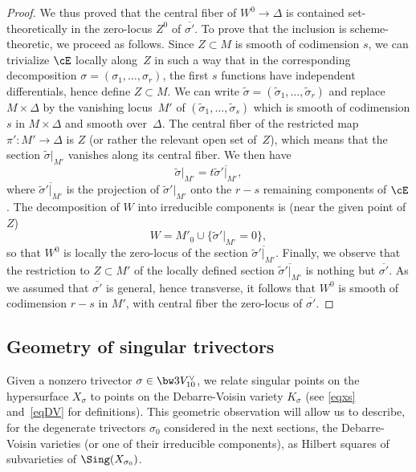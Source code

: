 \begin{proof}
We thus proved that
the central fiber of $W^0\to \Delta$ is contained set-theoretically in the zero-locus $Z^0$ of $\overline {\sigma'} $. To prove that the inclusion is scheme-theoretic, we proceed as follows.
Since $Z\subset M$ is smooth of codimension $s$, we can trivialize $\cE$ locally along~$Z$ in such a way
that in the corresponding decomposition $\sigma=(\sigma_1,\ldots,\sigma_r)$, the first $s$ functions have independent differentials, hence define $Z\subset M$. We can write
$\widetilde\sigma=(\widetilde\sigma_1,\ldots,\widetilde\sigma_r)$ and replace $M\times \Delta$ by the vanishing locus~$M'$ of
$(\widetilde\sigma_1,\ldots,\widetilde\sigma_s)$ which is smooth of codimension $s$ in $M\times \Delta$ and smooth
over~$\Delta$. The central fiber of the restricted map $\pi'\colon M'\to \Delta$ is $Z$ (or rather the relevant open set of~$Z$),
which means that the section $\widetilde\sigma\vert_{ M'}$ vanishes along its central fiber. We then have
\begin{equation}\label{eqpourMprime}
\widetilde\sigma\vert_{ M'}=t\overline{\widetilde\sigma'\vert_{ M'}},
\end{equation}
where $\overline{\widetilde\sigma'\vert_{ M'}}$ is the projection of $\widetilde\sigma'\vert_{ M'}$ onto the
$r-s$ remaining components of $\cE$.
The decomposition of $W$ into irreducible components is (near the given point of $Z$)
\[
W=M'_0\cup \{\widetilde\sigma'\vert_{ M'}=0\},
\]
so that $W^0$ is locally the zero-locus of the section $\overline{\widetilde\sigma'\vert_{ M'}}$. Finally, we observe that the restriction to $Z\subset M'$ of the locally defined section
$\overline{\widetilde\sigma'\vert_{ M'}}$ is nothing but $\overline { \sigma'} $. As we assumed that
$\overline { \sigma'} $ is general, hence transverse, it follows that
$W^0$ is smooth of codimension $r-s$ in $M'$, with central fiber the zero-locus of $\overline { \sigma'} $.
\end{proof}

\subsection{Geometry of singular trivectors}

Given a nonzero trivector $\sigma\in \bw3V_{10}^\vee$, we relate singular points on the hypersurface $X_\sigma$ to points on the Debarre-Voisin variety $K_\sigma$ (see \eqref{eqxs} and~\eqref{eqDV} for definitions). This geometric observation will allow us to describe, for the degenerate trivectors $\sigma_0$ considered in the next sections, the Debarre-Voisin varieties
(or one of their irreducible components), as
Hilbert squares of subvarieties of $\Sing(X_{\sigma_0})$.

